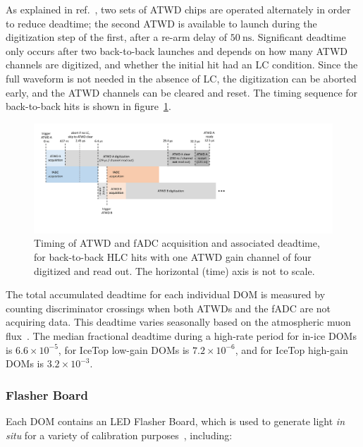 As explained in ref.~\cite{ICECUBE:DAQ}, two sets of ATWD chips are
operated alternately in order to reduce deadtime; the second ATWD is
available to launch during the digitization step of the first,
after a re-arm delay of $50~\mathrm{ns}$.  Significant deadtime
only occurs after two back-to-back launches and depends on how many
ATWD channels are digitized, and whether the initial hit had an LC
condition.  Since the full waveform is not needed in the absence of LC, the
digitization can be aborted early, and the ATWD channels can be cleared and
reset.  The timing sequence for back-to-back hits is shown in
figure~\ref{fig:atwd_timing}.

\begin{figure}[]
 \centering
 \includegraphics[width=1.0\textwidth]{graphics/dom/functional/atwd_timing.pdf}
 \caption{Timing of ATWD and fADC acquisition and associated deadtime, for
   back-to-back HLC hits with one ATWD gain channel of four digitized and read out.  The
   horizontal (time) axis is not to scale.}
 \label{fig:atwd_timing}
\end{figure}

The total accumulated deadtime for each individual DOM is measured by counting
discriminator crossings when both ATWDs and the fADC are not acquiring
data. This deadtime varies seasonally based on the atmospheric muon
flux~\cite{ICECUBE:IceTop}.  The median fractional deadtime during a
high-rate period for in-ice DOMs 
is $6.6\times10^{-5}$, for IceTop low-gain DOMs is $7.2\times 10^{-6}$, and
for IceTop high-gain DOMs is $3.2 \times 10^{-3}$.

\subsubsection{\label{sec:flasher}Flasher Board}

Each DOM contains an LED Flasher Board, which is used to generate
light \emph{in situ} for a
variety of calibration purposes~\cite{IC3:SC,Aartsen:2013rt}, including: 

